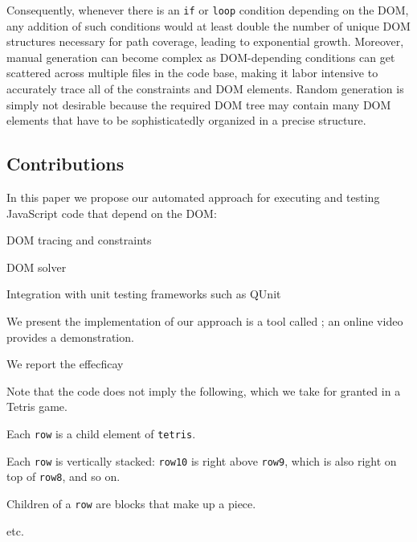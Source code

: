 Consequently, whenever there is an {\tt if} or {\tt loop} condition depending on the DOM, any addition of such conditions would at least double the number of unique DOM structures necessary for path coverage, leading to exponential growth.
Moreover, manual generation can become complex as DOM-depending conditions can get scattered across multiple files in the code base, making it labor intensive to accurately trace all of the constraints and DOM elements.
Random generation is simply not desirable because the required DOM tree may contain many DOM elements that have to be sophisticatedly organized in a precise structure.

\subsection{Contributions}
In this paper we propose our automated approach for executing and testing JavaScript code that depend on the DOM:
\begin {compactitem}
\item DOM tracing and constraints
\item DOM solver
\item Integration with unit testing frameworks such as QUnit
\item We present the implementation of our approach is a tool called \tool; an online video provides a demonstration.
\item We report the effecficay 
\end {compactitem}



Note that the code does not imply the following, which we take for granted in a Tetris game.
\begin {compactitem}
\item Each {\tt row} is a child element of {\tt tetris}.
\item Each {\tt row} is vertically stacked: {\tt row10} is right above {\tt row9}, which is also right on top of {\tt row8}, and so on.
\item Children of a {\tt row} are blocks that make up a piece.  
\item etc.
\end {compactitem}



